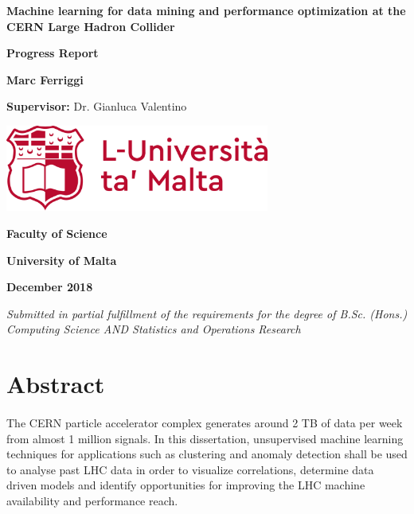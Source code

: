 \documentclass[12pt, twoside]{report}
\begin{document}
	\begin{titlepage}
		\centering
		{\LARGE\bfseries Machine learning for data mining and performance optimization at the CERN Large Hadron Collider \par}
		\vspace{.5cm}
		
		{\Large \textbf{Progress Report} \par}
		\vspace{.5cm}
		
		{\large \textbf{Marc Ferriggi}\par}
		\vspace{0.5cm}
		
		{\large \textbf{Supervisor:} Dr. Gianluca Valentino\par}
		\vfill
		
		\includegraphics[width=0.65\textwidth]{UoMLogo}\par
		\vfill
		
		{\large\bfseries Faculty of Science \par}
		{\large\bfseries University of Malta \par}
		{\large\bfseries December 2018 \par}
		
		\vspace{1cm}
		\textit{Submitted in partial fulfillment of the requirements for the degree of B.Sc. (Hons.) Computing Science AND Statistics and Operations Research}
	\end{titlepage}
	
	\tableofcontents
	\pagebreak
	
	\section{Abstract}
	\paragraph{ }The CERN particle accelerator complex generates around 2 TB of data per week from almost 1 million signals. In this dissertation, unsupervised machine learning techniques for applications such as clustering and anomaly detection shall be used to analyse past LHC data in order to visualize correlations, determine data driven models and identify opportunities for improving the LHC machine availability and performance reach.
	
\end{document}
